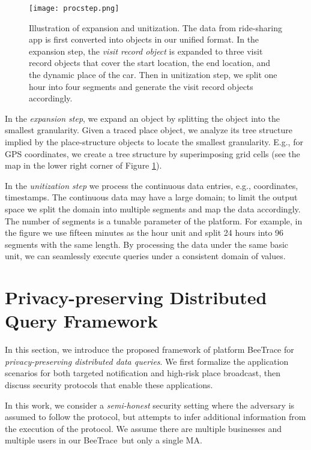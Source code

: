 \documentclass[11pt,dvipdfmx]{article}  %
\newcommand{\sysname}{\textsf{BeeTrace}\xspace}
\begin{document}
\begin{figure}
\centering
\texttt{[image: procstep.png]}
\caption{Illustration of expansion and unitization. The data from ride-sharing app is first converted into objects in our unified format. In the expansion step, the \emph{visit record object} is expanded to three visit record objects that cover the start location, the end location, and the dynamic place of the car. Then in unitization step, we split one hour into four segments and generate the visit record objects accordingly.}
\label{procstep}
\end{figure}

In the \emph{expansion step}, we expand an object by splitting the object into the smallest granularity. 
Given a traced place object, we analyze its tree structure implied by the  place-structure objects to locate the smallest granularity.
E.g., for GPS coordinates, we create a tree structure by superimposing grid cells (see the map in the lower right corner of Figure \ref{procstep}). 
 

In the \emph{unitization step} we process the continuous data entries, e.g., coordinates, timestamps. 
The continuous data may have a large domain; to limit the output space we split the domain into multiple segments and map the data accordingly. 
The number of segments is a tunable parameter of the platform. 
For example, in the figure we use fifteen minutes as the hour unit and split 24 hours into 96 segments with the same length. 
By processing the data under the same basic unit, we can seamlessly execute queries under a consistent domain of values.




\section{Privacy-preserving Distributed Query Framework}
\label{ppframework}

In this section, we introduce the proposed framework of platform \sysname for \emph{privacy-preserving distributed data queries}. We first formalize the application scenarios for both targeted notification and high-risk place broadcast, then discuss security protocols that enable these applications. %

In this work, we consider a \emph{semi-honest} security setting where the adversary is assumed to follow the protocol, but attempts to infer additional information from the execution of the protocol. We assume there are multiple businesses and multiple users in our \sysname\ but only a single MA. %
\end{document}
